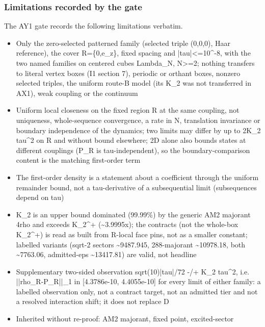 \subsubsection{Limitations recorded by the gate}
\label{sec:ay1-limits}
The AY1 gate records the following limitations verbatim.
\begin{gatequote}
\begin{itemize}
\item Only the zero-selected patterned family (selected triple (0,0,0), Haar
reference), the cover R=\{0,e\_z\}, fixed spacing and
|tau|<=10\textasciicircum{}-8, with the two named families on centered cubes
Lambda\_N, N>=2; nothing transfers to literal vertex boxes (I1 section 7),
periodic or orthant boxes, nonzero selected triples, the uniform route-B model
(its K\_2 was not transferred in AX1), weak coupling or the continuum
\item Uniform local closeness on the fixed region R at the same coupling, not
uniqueness, whole-sequence convergence, a rate in N, translation invariance or
boundary independence of the dynamics; two limits may differ by up to
2K\_2\textquotesingle{} tau\textasciicircum{}2 on R and without bound
elsewhere; 2D alone also bounds states at different couplings (P\_R is
tau-independent), so the boundary-comparison content is the matching
first-order term
\item The first-order density is a statement about a coefficient through the uniform
remainder bound, not a tau-derivative of a subsequential limit (subsequences
depend on tau)
\item K\_2\textquotesingle{} is an upper bound dominated (99.99\%) by the generic
AM2 majorant 4rho and exceeds K\_2\textasciicircum{}+
(\textasciitilde{}3.9995x); the contract\textquotesingle{}s
\textquotesingle{}(not the whole-box
K\_2\textasciicircum{}+)\textquotesingle{} is read as \textquotesingle{}built
from R-local face pins\textquotesingle{}, not as a smaller constant; labelled
variants (sqrt-2 sectors \textasciitilde{}9487.945, 288-majorant
\textasciitilde{}10978.18, both \textasciitilde{}7763.06, admitted-eps
\textasciitilde{}13417.81) are valid, not headline
\item Supplementary two-sided observation sqrt(10)|tau|/72 -/+
K\_2\textquotesingle{} tau\textasciicircum{}2, i.e. ||rho\_R-P\_R||\_1 in
[4.3786e-10, 4.4055e-10] for every limit of either family: a labelled
observation only, not a contract target, not an admitted tier and not a
resolved interaction shift; it does not replace D
\item Inherited without re-proof: AM2 majorant, fixed point, excited-sector

\end{itemize}
\end{gatequote}
